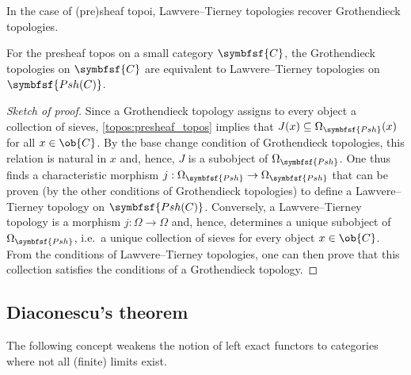     In the case of (pre)sheaf topoi, Lawvere--Tierney topologies recover Grothendieck topologies.
    \begin{result}
        For the presheaf topos on a small category $\symbfsf{C}$, the Grothendieck topologies on $\symbfsf{C}$ are equivalent to Lawvere--Tierney topologies on $\symbfsf{Psh(C)}$.
        \begin{mdframed}[roundcorner=10pt, linecolor=blue, linewidth=1pt]
            \begin{proof}[Sketch of proof]
                Since a Grothendieck topology assigns to every object a collection of sieves, \cref{topos:presheaf_topos} implies that $J(x)\subseteq\Omega_{\symbfsf{Psh}}(x)$ for all $x\in\ob{C}$. By the base change condition of Grothendieck topologies, this relation is natural in $x$ and, hence, $J$ is a subobject of $\Omega_{\symbfsf{Psh}}$. One thus finds a characteristic morphism $j:\Omega_{\symbfsf{Psh}}\rightarrow\Omega_{\symbfsf{Psh}}$ that can be proven (by the other conditions of Grothendieck topologies) to define a Lawvere--Tierney topology on $\symbfsf{Psh(C)}$. Conversely, a Lawvere--Tierney topology is a morphism $j:\Omega\rightarrow\Omega$ and, hence, determines a unique subobject of $\Omega_{\symbfsf{Psh}}$, i.e.~a unique collection of sieves for every object $x\in\ob{C}$. From the conditions of Lawvere--Tierney topologies, one can then prove that this collection satisfies the conditions of a Grothendieck topology.
            \end{proof}
        \end{mdframed}
    \end{result}

\subsection{Diaconescu's theorem}\label{section:diaconescu}

    The following concept weakens the notion of left exact functors to categories where not all (finite) limits exist.


